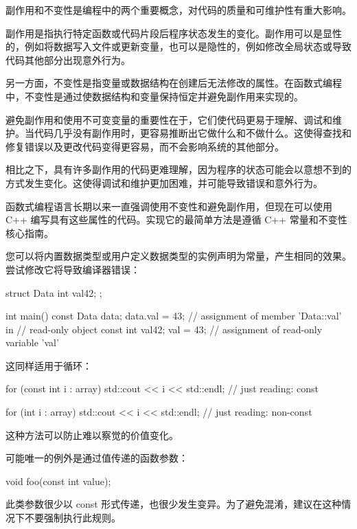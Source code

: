 
副作用和不变性是编程中的两个重要概念，对代码的质量和可维护性有重大影响。

副作用是指执行特定函数或代码片段后程序状态发生的变化。副作用可以是显性的，例如将数据写入文件或更新变量，也可以是隐性的，例如修改全局状态或导致代码其他部分出现意外行为。

另一方面，不变性是指变量或数据结构在创建后无法修改的属性。在函数式编程中，不变性是通过使数据结构和变量保持恒定并避免副作用来实现的。

避免副作用和使用不可变变量的重要性在于，它们使代码更易于理解、调试和维护。当代码几乎没有副作用时，更容易推断出它做什么和不做什么。这使得查找和修复错误以及更改代码变得更容易，而不会影响系统的其他部分。

相比之下，具有许多副作用的代码更难理解，因为程序的状态可能会以意想不到的方式发生变化。这使得调试和维护更加困难，并可能导致错误和意外行为。

函数式编程语言长期以来一直强调使用不变性和避免副作用，但现在可以使用 C++ 编写具有这些属性的代码。实现它的最简单方法是遵循 C++ 常量和不变性核心指南。


您可以将内置数据类型或用户定义数据类型的实例声明为常量，产生相同的效果。尝试修改它将导致编译器错误：

\begin{cpp}
struct Data {
    int val{42};
};

int main() {
    const Data data;
    data.val = 43; // assignment of member 'Data::val' in
                   // read-only object
    const int val{42};
    val = 43; // assignment of read-only variable 'val'
}
\end{cpp}

这同样适用于循环：

\begin{cpp}
for (const int i : array) {
    std::cout << i << std::endl; // just reading: const
}

for (int i : array) {
    std::cout << i << std::endl; // just reading: non-const
}
\end{cpp}

这种方法可以防止难以察觉的价值变化。

可能唯一的例外是通过值传递的函数参数：

\begin{cpp}
void foo(const int value);
\end{cpp}

此类参数很少以 const 形式传递，也很少发生变异。为了避免混淆，建议在这种情况下不要强制执行此规则。

